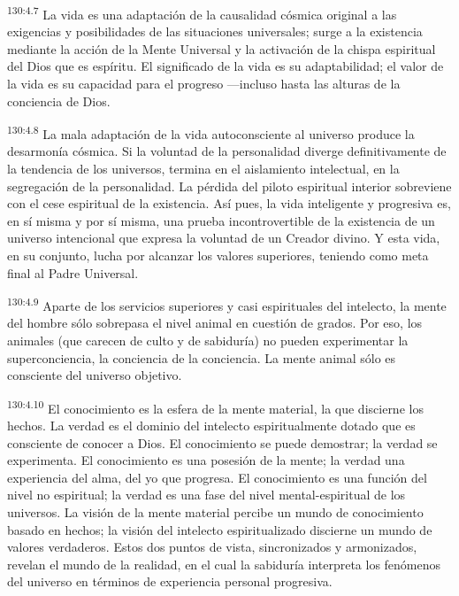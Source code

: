 \par 
\textsuperscript{130:4.7} La vida es una adaptación de la causalidad cósmica original a las exigencias y posibilidades de las situaciones universales; surge a la existencia mediante la acción de la Mente Universal y la activación de la chispa espiritual del Dios que es espíritu. El significado de la vida es su adaptabilidad; el valor de la vida es su capacidad para el progreso ---incluso hasta las alturas de la conciencia de Dios.

\par 
\textsuperscript{130:4.8} La mala adaptación de la vida autoconsciente al universo produce la desarmonía cósmica. Si la voluntad de la personalidad diverge definitivamente de la tendencia de los universos, termina en el aislamiento intelectual, en la segregación de la personalidad. La pérdida del piloto espiritual interior sobreviene con el cese espiritual de la existencia. Así pues, la vida inteligente y progresiva es, en sí misma y por sí misma, una prueba incontrovertible de la existencia de un universo intencional que expresa la voluntad de un Creador divino. Y esta vida, en su conjunto, lucha por alcanzar los valores superiores, teniendo como meta final al Padre Universal.

\par 
\textsuperscript{130:4.9} Aparte de los servicios superiores y casi espirituales del intelecto, la mente del hombre sólo sobrepasa el nivel animal en cuestión de grados. Por eso, los animales (que carecen de culto y de sabiduría) no pueden experimentar la superconciencia, la conciencia de la conciencia. La mente animal sólo es consciente del universo objetivo.

\par 
\textsuperscript{130:4.10} El conocimiento es la esfera de la mente material, la que discierne los hechos. La verdad es el dominio del intelecto espiritualmente dotado que es consciente de conocer a Dios. El conocimiento se puede demostrar; la verdad se experimenta. El conocimiento es una posesión de la mente; la verdad una experiencia del alma, del yo que progresa. El conocimiento es una función del nivel no espiritual; la verdad es una fase del nivel mental-espiritual de los universos. La visión de la mente material percibe un mundo de conocimiento basado en hechos; la visión del intelecto espiritualizado discierne un mundo de valores verdaderos. Estos dos puntos de vista, sincronizados y armonizados, revelan el mundo de la realidad, en el cual la sabiduría interpreta los fenómenos del universo en términos de experiencia personal progresiva.

